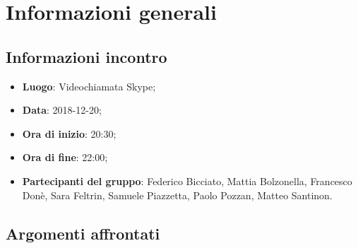 \section{Informazioni generali}

\subsection{Informazioni incontro}
\begin{itemize}
\item \textbf{Luogo}: Videochiamata Skype;
\item \textbf{Data}: 2018-12-20;
\item \textbf{Ora di inizio}: 20:30;
\item \textbf{Ora di fine}: 22:00;
\item \textbf{Partecipanti del gruppo}: Federico Bicciato, Mattia Bolzonella, 
Francesco Donè, Sara Feltrin, Samuele Piazzetta, Paolo Pozzan, 
Matteo Santinon. 
\end{itemize}

\subsection{Argomenti affrontati}


